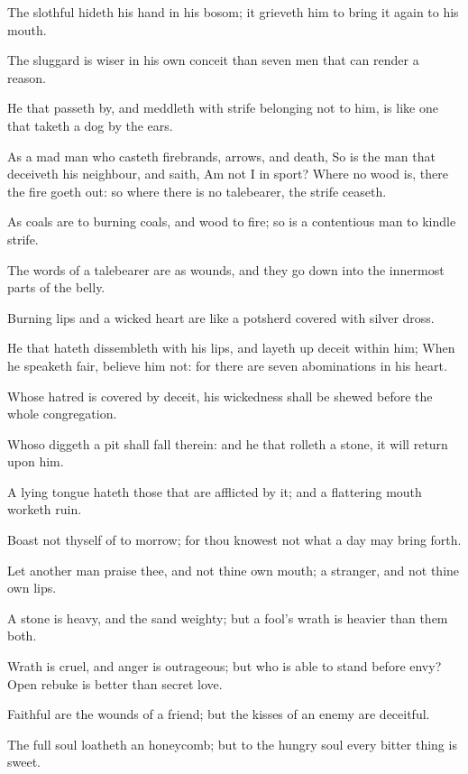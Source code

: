 \Verse The slothful hideth his hand in his bosom; it grieveth him to bring it again to his mouth.

\Verse The sluggard is wiser in his own conceit than seven men that can render a reason.

\Verse He that passeth by, and meddleth with strife belonging not to him, is like one that taketh a dog by the ears.

\Verse As a mad man who casteth firebrands, arrows, and death, \Verse So is the man that deceiveth his neighbour, and saith, Am not I in sport?  \Verse Where no wood is, there the fire goeth out: so where there is no talebearer, the strife ceaseth.

\Verse As coals are to burning coals, and wood to fire; so is a contentious man to kindle strife.

\Verse The words of a talebearer are as wounds, and they go down into the innermost parts of the belly.

\Verse Burning lips and a wicked heart are like a potsherd covered with silver dross.

\Verse He that hateth dissembleth with his lips, and layeth up deceit within him; \Verse When he speaketh fair, believe him not: for there are seven abominations in his heart.

\Verse Whose hatred is covered by deceit, his wickedness shall be shewed before the whole congregation.

\Verse Whoso diggeth a pit shall fall therein: and he that rolleth a stone, it will return upon him.

\Verse A lying tongue hateth those that are afflicted by it; and a flattering mouth worketh ruin.


\Chapter
\Verse Boast not thyself of to morrow; for thou knowest not what a day may bring forth.

\Verse Let another man praise thee, and not thine own mouth; a stranger, and not thine own lips.

\Verse A stone is heavy, and the sand weighty; but a fool's wrath is heavier than them both.

\Verse Wrath is cruel, and anger is outrageous; but who is able to stand before envy?  \Verse Open rebuke is better than secret love.

\Verse Faithful are the wounds of a friend; but the kisses of an enemy are deceitful.

\Verse The full soul loatheth an honeycomb; but to the hungry soul every bitter thing is sweet.

